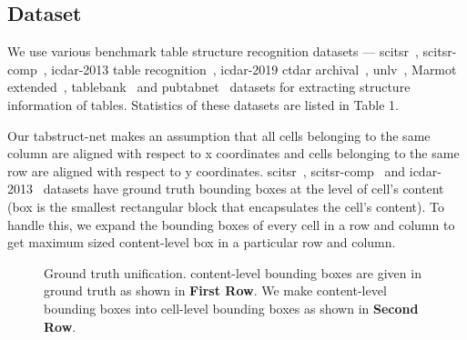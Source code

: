 \documentclass[runningheads]{llncs}
\begin{document}
\subsection*{Dataset}

We use various benchmark table structure recognition datasets --- {\sc s}ci{\sc tsr}~\cite{chi2019complicated}, {\sc s}ci{\sc tsr}-{\sc comp}~\cite{chi2019complicated}, {\sc icdar}-2013 table recognition~\cite{gobel2013icdar}, {\sc icdar}-2019 c{\sc td}a{\sc r} archival~\cite{gao2019icdar}, {\sc unlv}~\cite{shahab2010open}, Marmot extended~\cite{paliwal2019tablenet}, {\sc t}able{\sc b}ank~\cite{li2019tablebank} and {\sc p}ub{\sc t}ab{\sc n}et~\cite{zhong2019image} datasets for extracting structure information of tables. Statistics of these datasets are listed in Table 1.

Our {\sc t}ab{\sc s}truct-{\sc n}et makes an assumption that all cells belonging to the same column are aligned with respect to x coordinates and cells belonging to the same row are aligned with respect to y coordinates. {\sc s}ci{\sc tsr}~\cite{chi2019complicated}, {\sc s}ci{\sc tsr}-{\sc comp}~\cite{chi2019complicated} and {\sc icdar}-2013~\cite{gobel2013icdar} datasets have ground truth bounding boxes at the level of cell's content (box is the smallest rectangular block that encapsulates the cell's content). To handle this, we expand the bounding boxes of every cell in a row and column to get maximum sized content-level box in a particular row and column. 

\begin{figure}[ht!]
\begin{center}
\hspace{-0.01\textwidth}
\hspace{-0.01\textwidth}
\vspace{0.001\textwidth}
\hspace{-0.01\textwidth}
\hspace{-0.01\textwidth}
\end{center}
\caption{Ground truth unification. content-level bounding boxes are given in ground truth as shown in \textbf{First Row}. We make content-level bounding boxes into cell-level bounding boxes as shown in \textbf{Second Row}.} \label{fig_unify_gt}
\end{figure}
\end{document}
